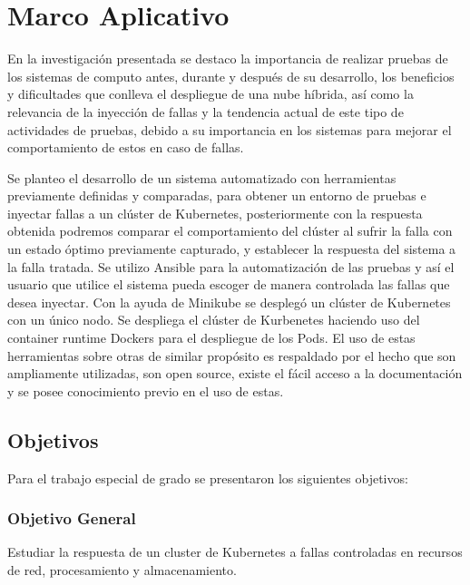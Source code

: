 \chapter{Marco Aplicativo}

\par En la investigación presentada se destaco la importancia de realizar pruebas de los sistemas de computo antes, durante y después de su desarrollo, los beneficios y dificultades que conlleva el despliegue de una nube híbrida, así como la relevancia de la inyección de fallas y la tendencia actual de este tipo de actividades de pruebas, debido a su importancia en los sistemas para mejorar el comportamiento de estos en caso de fallas.\\
\par Se planteo el desarrollo de un sistema automatizado con herramientas previamente definidas y comparadas, para obtener un entorno de pruebas e inyectar fallas a un clúster de Kubernetes, posteriormente con la respuesta obtenida podremos comparar el comportamiento del clúster al sufrir la falla con un estado óptimo previamente capturado, y establecer la respuesta del sistema a la falla tratada. Se utilizo Ansible para la automatización de las pruebas y así el usuario que utilice el sistema pueda escoger de manera controlada las fallas que desea inyectar. Con la ayuda de Minikube se desplegó un clúster de Kubernetes con un único nodo. Se despliega el clúster de Kurbenetes haciendo uso del container runtime Dockers para el despliegue de los Pods. El uso de estas herramientas sobre otras de similar propósito es respaldado por el hecho que son ampliamente utilizadas, son open source, existe el fácil acceso a la documentación y se posee conocimiento previo en el uso de estas.\\
\section{Objetivos}\label{sec:41}
\par Para el trabajo especial de grado se presentaron los siguientes objetivos:

\subsection{Objetivo General}


\par Estudiar la respuesta de un cluster de Kubernetes a fallas controladas en recursos de red, procesamiento y almacenamiento.

